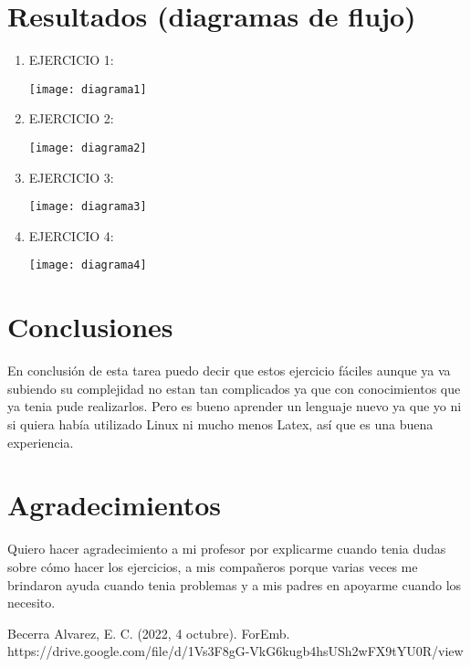 \documentclass[conference]{IEEEtran}
\begin{document}
\section{Resultados (diagramas de flujo)}
\begin{enumerate}
  	\item EJERCICIO 1:\\
  	\begin{center}
	\texttt{[image: diagrama1]} 
	\end{center}
\newpage
	\item  EJERCICIO 2:\\
	\begin{center}
	\texttt{[image: diagrama2]} \\
	\end{center}
\newpage	
	\item  EJERCICIO 3:\\
	\begin{center}
	\texttt{[image: diagrama3]} \\
	\end{center}
\newpage	
	\item  EJERCICIO 4:\\
	\begin{center}
	\texttt{[image: diagrama4]} \\
	\end{center}

\end{enumerate}

\section{Conclusiones}  
En conclusión de esta tarea puedo decir que estos ejercicio fáciles aunque ya va subiendo su complejidad no estan tan complicados ya que con conocimientos que ya tenia pude realizarlos. Pero es bueno aprender un lenguaje nuevo ya que yo ni si quiera había utilizado Linux ni mucho menos Latex, así que es una buena experiencia.

\section*{Agradecimientos}
Quiero hacer agradecimiento a mi profesor por explicarme cuando tenia dudas sobre cómo hacer los ejercicios, a mis compañeros porque varias veces me brindaron ayuda cuando tenia problemas y a mis padres en apoyarme cuando los necesito.

\begin{thebibliography}{00}
 Becerra Alvarez, E. C. (2022, 4 octubre). ForEmb. https://drive.google.com/file/d/1Vs3F8gG-VkG6kugb4hsUSh2wFX9tYU0R/view
\end{thebibliography}
\end{document}
